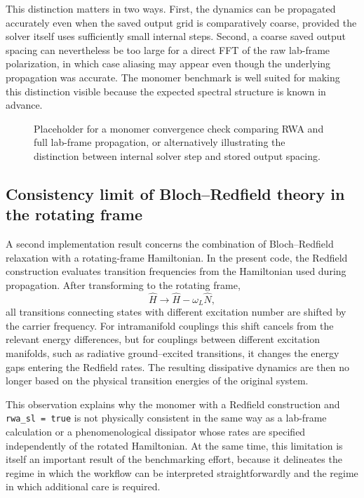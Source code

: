 This distinction matters in two ways.
First, the dynamics can be propagated accurately even when the saved output grid
is comparatively coarse, provided the solver itself uses sufficiently small
internal steps.
Second, a coarse saved output spacing can nevertheless be too large for a direct
FFT of the raw lab-frame polarization, in which case aliasing may appear even
though the underlying propagation was accurate.
The monomer benchmark is well suited for making this distinction visible because
the expected spectral structure is known in advance.

\begin{figure}[htbp]
    \centering
    \caption{Placeholder for a monomer convergence check comparing RWA and full
    lab-frame propagation, or alternatively illustrating the distinction between
    internal solver step and stored output spacing.}
    \label{fig:rslts_monomer_rwa_vs_full_timestep}
\end{figure}

\subsection{Consistency limit of Bloch--Redfield theory in the rotating frame}

A second implementation result concerns the combination of Bloch--Redfield
relaxation with a rotating-frame Hamiltonian.
In the present code, the Redfield construction evaluates transition frequencies
from the Hamiltonian used during propagation.
After transforming to the rotating frame,
\begin{equation*}
    \hat{H} \rightarrow \hat{H} - \omega_L \hat{N},
\end{equation*}
all transitions connecting states with different excitation number are shifted by
the carrier frequency.
For intramanifold couplings this shift cancels from the relevant energy
differences, but for couplings between different excitation manifolds, such as
radiative ground--excited transitions, it changes the energy gaps entering the
Redfield rates.
The resulting dissipative dynamics are then no longer based on the physical
transition energies of the original system.

This observation explains why the monomer with a Redfield construction and
\verb|rwa_sl = true| is not physically consistent in the same way as a
lab-frame calculation or a phenomenological dissipator whose rates are specified
independently of the rotated Hamiltonian.
At the same time, this limitation is itself an important result of the
benchmarking effort, because it delineates the regime in which the workflow can
be interpreted straightforwardly and the regime in which additional care is
required.

